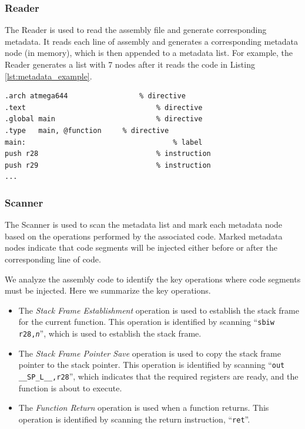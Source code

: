\subsubsection{Reader}

The Reader is used to read the assembly file and generate corresponding metadata. It reads each line of assembly and generates a corresponding metadata node (in memory), which is then appended to a metadata list. For example, the Reader generates a list with 7 nodes after it reads the code in Listing \ref{lst:metadata_example}.
\vspace{-15pt}
\begin{lstlisting}[float=h,label=lst:metadata_example,caption=Assembly Code Example]
.arch atmega644					% directive
.text								% directive
.global	main						% directive
.type	main, @function		% directive
main:									% label
push r28							% instruction
push r29							% instruction
...
\end{lstlisting}
\vspace{-25pt}
\vspace{-15pt}
\subsubsection{Scanner}\label{sec:scanner}

The Scanner is used to scan the metadata list and mark each metadata node based on the operations performed by the associated code. Marked metadata nodes indicate that code segments will be injected either before or after the corresponding line of code.

We analyze the assembly code to identify the key operations where code segments must be injected. Here we summarize the key operations.

\begin{itemize} \itemsep 0in
\item The \textit{Stack Frame Establishment} operation is used to establish the stack frame for the current function. This operation is identified by scanning ``\texttt{sbiw r28,\textit{n}}'', which is used to establish the stack frame.

\item The \textit{Stack Frame Pointer Save} operation is used to copy the stack frame pointer to the stack pointer. This operation is identified by scanning ``\texttt{out \_\_SP\_L\_\_,r28}'', which indicates that the required registers are ready, and the function is about to execute. 

\item The \textit{Function Return} operation is used when a function returns. This operation is identified by scanning the return instruction, ``\texttt{ret}''.
\end{itemize}

